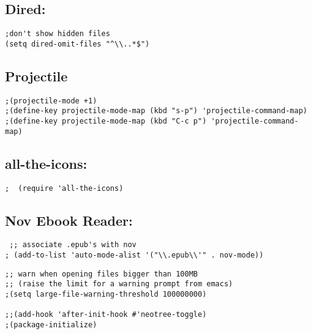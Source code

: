 \documentclass[11pt]{article}
\begin{document}
\subsection{Dired:}
\label{sec:org4567513}
\begin{verbatim}
;don't show hidden files
(setq dired-omit-files "^\\..*$")
\end{verbatim}
\subsection{Projectile}
\label{sec:orgba3830d}
\begin{verbatim}
;(projectile-mode +1)
;(define-key projectile-mode-map (kbd "s-p") 'projectile-command-map)
;(define-key projectile-mode-map (kbd "C-c p") 'projectile-command-map)
\end{verbatim}

\subsection{all-the-icons:}
\label{sec:orgeda058c}
\begin{verbatim}
;  (require 'all-the-icons)
\end{verbatim}
\subsection{Nov Ebook Reader:}
\label{sec:org4c7ecf1}
\begin{verbatim}
 ;; associate .epub's with nov
; (add-to-list 'auto-mode-alist '("\\.epub\\'" . nov-mode))
\end{verbatim}

\begin{verbatim}
;; warn when opening files bigger than 100MB
;; (raise the limit for a warning prompt from emacs)
;(setq large-file-warning-threshold 100000000)

;;(add-hook 'after-init-hook #'neotree-toggle)
;(package-initialize)

\end{verbatim}
\end{document}
